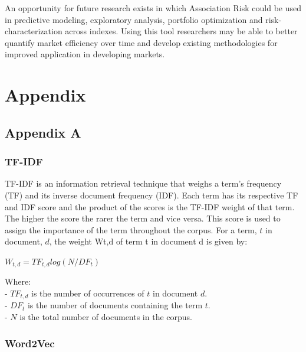 \documentclass[11pt]{article}
\begin{document}
An opportunity for future research exists in which Association Risk
could be used in predictive modeling, exploratory analysis, portfolio
optimization and risk-characterization across indexes. Using this tool
researchers may be able to better quantify market efficiency over time
and develop existing methodologies for improved application in
developing markets.

\newpage

\hypertarget{appendix}{%
\section{Appendix}\label{appendix}}

\hypertarget{appendix-a}{%
\subsection{Appendix A}\label{appendix-a}}

\hypertarget{tf-idf}{%
\subsubsection{TF-IDF}\label{tf-idf}}

TF-IDF is an information retrieval technique that weighs a term's
frequency (TF) and its inverse document frequency (IDF). Each term has
its respective TF and IDF score and the product of the scores is the
TF-IDF weight of that term. The higher the score the rarer the term and
vice versa. This score is used to assign the importance of the term
throughout the corpus. For a term, \(t\) in document, \(d\), the weight
Wt,d of term t in document d is given by:

\(W_{t,d} = TF_{t,d} log(N/DF_{t})\)

Where:\\
- \(TF_{t,d}\) is the number of occurrences of \(t\) in document
\(d\).\\
- \(DF_{t}\) is the number of documents containing the term \(t\).\\
- \(N\) is the total number of documents in the corpus.

\hypertarget{word2vec}{%
\subsubsection{Word2Vec}\label{word2vec}}
\end{document}
